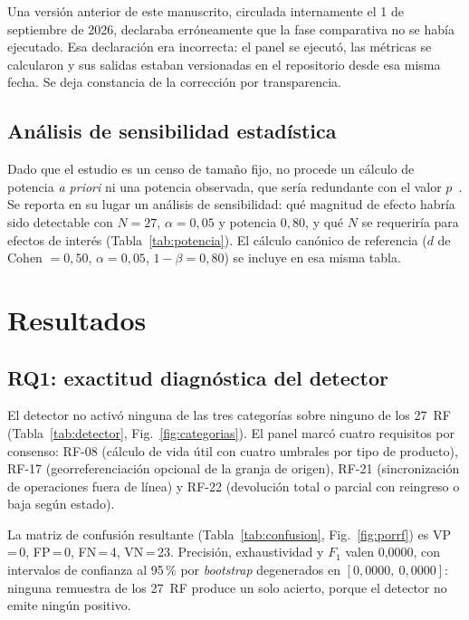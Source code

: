\documentclass[runningheads]{llncs}
\begin{document}
\noindent
Una versión anterior de este manuscrito, circulada internamente el 1 de
septiembre de 2026, declaraba erróneamente que la fase comparativa no se había
ejecutado. Esa declaración era incorrecta: el panel se ejecutó, las métricas se
calcularon y sus salidas estaban versionadas en el repositorio desde esa misma
fecha. Se deja constancia de la corrección por transparencia.

\subsection{Análisis de sensibilidad estadística}

Dado que el estudio es un censo de tamaño fijo, no procede un cálculo de
potencia \textit{a priori} ni una potencia observada, que sería redundante con
el valor $p$~\cite{hoenig2001}. Se reporta en su lugar un análisis de
sensibilidad: qué magnitud de efecto habría sido detectable con
$N = 27$, $\alpha = 0{,}05$ y potencia $0{,}80$, y qué $N$ se requeriría para
efectos de interés (Tabla~\ref{tab:potencia}). El cálculo canónico de
referencia ($d$ de Cohen $=0{,}50$, $\alpha = 0{,}05$, $1-\beta = 0{,}80$)
\cite{cohen1988power,champely2020pwr} se incluye en esa misma tabla.

\section{Resultados}
\label{sec:results}

\subsection{RQ1: exactitud diagnóstica del detector}

El detector no activó ninguna de las tres categorías sobre ninguno de los
27~RF (Tabla~\ref{tab:detector}, Fig.~\ref{fig:categorias}). El panel marcó
cuatro requisitos por consenso: RF-08 (cálculo de vida útil con cuatro umbrales
por tipo de producto), RF-17 (georreferenciación opcional de la granja de
origen), RF-21 (sincronización de operaciones fuera de línea) y RF-22
(devolución total o parcial con reingreso o baja según estado).

La matriz de confusión resultante (Tabla~\ref{tab:confusion},
Fig.~\ref{fig:porrf}) es VP\,=\,0, FP\,=\,0, FN\,=\,4, VN\,=\,23. Precisión,
exhaustividad y $F_1$ valen 0,0000, con intervalos de confianza al 95\,\% por
\textit{bootstrap} degenerados en $[0{,}0000,\ 0{,}0000]$: ninguna
remuestra de los 27~RF produce un solo acierto, porque el detector no emite
ningún positivo.
\end{document}
